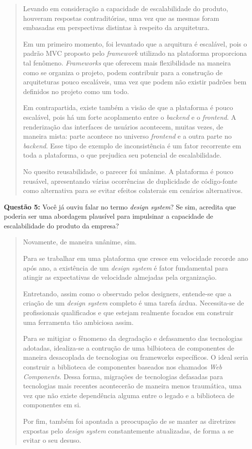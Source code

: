 \begin{quote}
    Levando em consideração a capacidade de escalabilidade do produto, houveram respostas contraditórias, uma vez que as mesmas foram embasadas em perspectivas distintas à respeito da arquitetura.
    
    Em um primeiro momento, foi levantado que a arquitura é escalável, pois o padrão MVC proposto pelo \textit{framework} utilizado na plataforma proporciona tal fenômeno. \textit{Frameworks} que oferecem mais flexibilidade na maneira como se organiza o projeto, podem contribuir para a construção de arquiteturas pouco escaláveis, uma vez que podem não existir padrões bem definidos no projeto como um todo.
    
    Em contrapartida, existe também a visão de que a plataforma é pouco escalável, pois há um forte acoplamento entre o \textit{backend} e o \textit{frontend}. A renderização das interfaces de usuários acontecem, muitas vezes, de maneira mista: parte acontece no universo \textit{frontend} e a outra parte no \textit{backend}. Esse tipo de exemplo de inconsistência é um fator recorrente em toda a plataforma, o que prejudica seu potencial de escalabilidade.
    
    No quesito reusabilidade, o parecer foi unânime. A plataforma é pouco reusável, apresentando várias ocorrências de duplicidade de código-fonte como alternativa para se evitar efeitos colaterais em cenários alternativos.
\end{quote}

\textbf{Questão 5:} Você já ouviu falar no termo \textit{design system}? Se sim, acredita que poderia ser uma abordagem plausível para impulsinar a capacidade de escalabilidade do produto da empresa?

\begin{quote}
    Novamente, de maneira unânime, sim.

    Para se trabalhar em uma plataforma que cresce em velocidade recorde ano após ano, a existência de um \textit{design system} é fator fundamental para atingir as expectativas de velocidade almejadas pela organização.
    
    Entretando, assim como o observado pelos designers, entende-se que a criação de um \textit{design system} completo é uma tarefa árdua. Necessita-se de profissionais qualificados e que estejam realmente focados em construir uma ferramenta tão ambiciosa assim.
    
    Para se mitigiar o fênomeno da degradação e defasamento das tecnologias adotadas, idealiza-se a contrução de uma bilbioteca de componentes de maneira desacoplada de tecnologias ou frameworks específicos. O ideal seria construir a biblioteca de componentes baseados nos chamados \textit{Web Components}. Dessa forma, migrações de tecnologias defasadas para tecnologias mais recentes acontecerão de maneira menos traumática, uma vez que não existe dependência alguma entre o legado e a biblioteca de componentes em si.
    
    Por fim, também foi apontada a preocupação de se manter as diretrizes expostas pelo \textit{design system} constantemente atualizadas, de forma a se evitar o seu desuso.
\end{quote}

